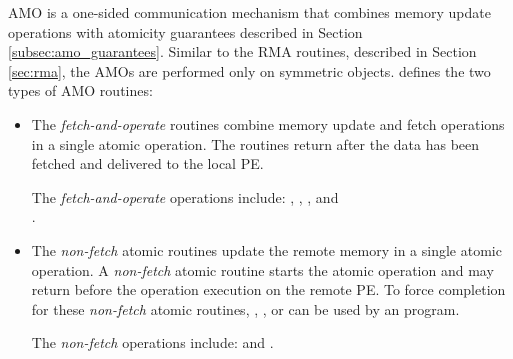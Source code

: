 \label{sec:amo}
\ac{AMO} is a one-sided communication mechanism that combines memory update operations with atomicity guarantees described in Section \ref{subsec:amo_guarantees}. 
Similar to the \ac{RMA} routines, described in Section \ref{sec:rma},
the \acp{AMO} are performed only on symmetric objects. 
\openshmem{} defines the two types of \ac{AMO} routines:
\begin{itemize}
\item %
The \textit{fetch-and-operate} routines combine memory update and fetch 
operations in a single atomic operation.
The routines return after the data has been fetched and delivered to the local \ac{PE}.

The \textit{fetch-and-operate} operations include: , , , and\\ .

\item %
The \textit{non-fetch} atomic routines update the remote memory 
in a single atomic operation.
A \textit{non-fetch} atomic routine
starts the atomic operation and may return before the operation execution
on the remote \ac{PE}. 
To force completion for these \textit{non-fetch} atomic routines, , 
, or  can be used by an \openshmem{} program. 

The \textit{non-fetch} operations include:  and .
\end{itemize}
